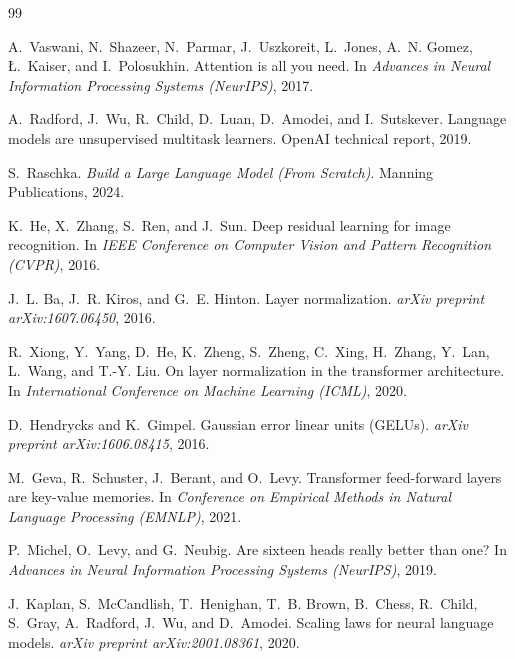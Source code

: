 \documentclass[11pt,a4paper]{article}
\begin{document}
\begin{thebibliography}{99}\small

A.~Vaswani, N.~Shazeer, N.~Parmar, J.~Uszkoreit, L.~Jones, A.~N. Gomez, {\L}.~Kaiser, and I.~Polosukhin.
\newblock Attention is all you need.
\newblock In \emph{Advances in Neural Information Processing Systems (NeurIPS)}, 2017.

A.~Radford, J.~Wu, R.~Child, D.~Luan, D.~Amodei, and I.~Sutskever.
\newblock Language models are unsupervised multitask learners.
\newblock OpenAI technical report, 2019.

S.~Raschka.
\newblock \emph{Build a Large Language Model (From Scratch)}.
\newblock Manning Publications, 2024.

K.~He, X.~Zhang, S.~Ren, and J.~Sun.
\newblock Deep residual learning for image recognition.
\newblock In \emph{IEEE Conference on Computer Vision and Pattern Recognition (CVPR)}, 2016.

J.~L. Ba, J.~R. Kiros, and G.~E. Hinton.
\newblock Layer normalization.
\newblock \emph{arXiv preprint arXiv:1607.06450}, 2016.

R.~Xiong, Y.~Yang, D.~He, K.~Zheng, S.~Zheng, C.~Xing, H.~Zhang, Y.~Lan, L.~Wang, and T.-Y. Liu.
\newblock On layer normalization in the transformer architecture.
\newblock In \emph{International Conference on Machine Learning (ICML)}, 2020.

D.~Hendrycks and K.~Gimpel.
\newblock Gaussian error linear units ({GELUs}).
\newblock \emph{arXiv preprint arXiv:1606.08415}, 2016.

M.~Geva, R.~Schuster, J.~Berant, and O.~Levy.
\newblock Transformer feed-forward layers are key-value memories.
\newblock In \emph{Conference on Empirical Methods in Natural Language Processing (EMNLP)}, 2021.

P.~Michel, O.~Levy, and G.~Neubig.
\newblock Are sixteen heads really better than one?
\newblock In \emph{Advances in Neural Information Processing Systems (NeurIPS)}, 2019.

J.~Kaplan, S.~McCandlish, T.~Henighan, T.~B. Brown, B.~Chess, R.~Child, S.~Gray, A.~Radford, J.~Wu, and D.~Amodei.
\newblock Scaling laws for neural language models.
\newblock \emph{arXiv preprint arXiv:2001.08361}, 2020.


\end{thebibliography}
\end{document}
